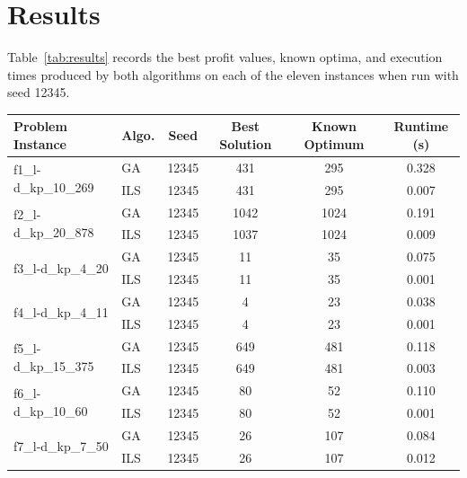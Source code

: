 \documentclass[12pt, a4paper]{article}
\begin{document}
\section{Results}
\label{sec:results}

Table~\ref{tab:results} records the best profit values, known optima, and execution times produced by both algorithms on each of the eleven instances when run with seed 12345.

\begin{table}[ht]
    \centering
    \small
    \renewcommand{\arraystretch}{1.2}
    \begin{tabular}{llcccc}
        \toprule
        \textbf{Problem Instance} & \textbf{Algo.} & \textbf{Seed} &
        \textbf{Best Solution} & \textbf{Known Optimum} & \textbf{Runtime (s)} \\
        \midrule
        \multirow{2}{*}{f1\_l-d\_kp\_10\_269}
            & GA  & 12345 & 431  & 295  & 0.328 \\
            & ILS & 12345 & 431  & 295  & 0.007 \\
        \midrule
        \multirow{2}{*}{f2\_l-d\_kp\_20\_878}
            & GA  & 12345 & 1042 & 1024 & 0.191 \\
            & ILS & 12345 & 1037 & 1024 & 0.009 \\
        \midrule
        \multirow{2}{*}{f3\_l-d\_kp\_4\_20}
            & GA  & 12345 & 11   & 35   & 0.075 \\
            & ILS & 12345 & 11   & 35   & 0.001 \\
        \midrule
        \multirow{2}{*}{f4\_l-d\_kp\_4\_11}
            & GA  & 12345 & 4    & 23   & 0.038 \\
            & ILS & 12345 & 4    & 23   & 0.001 \\
        \midrule
        \multirow{2}{*}{f5\_l-d\_kp\_15\_375}
            & GA  & 12345 & 649  & 481  & 0.118 \\
            & ILS & 12345 & 649  & 481  & 0.003 \\
        \midrule
        \multirow{2}{*}{f6\_l-d\_kp\_10\_60}
            & GA  & 12345 & 80   & 52   & 0.110 \\
            & ILS & 12345 & 80   & 52   & 0.001 \\
        \midrule
        \multirow{2}{*}{f7\_l-d\_kp\_7\_50}
            & GA  & 12345 & 26   & 107  & 0.084 \\
            & ILS & 12345 & 26   & 107  & 0.012 \\
        \midrule

\end{tabular}
\end{table}
\end{document}

